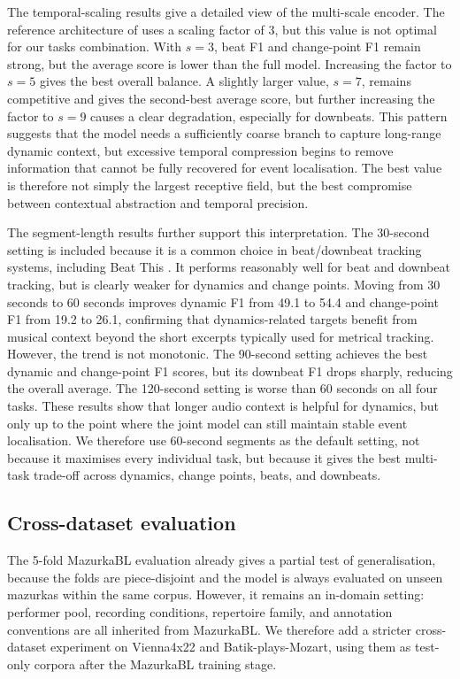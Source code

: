 The temporal-scaling results give a detailed view of the multi-scale encoder. The reference architecture of \cite{li2023frame} uses a scaling factor of 3, but this value is not optimal for our tasks combination. With $s=3$, beat F1 and change-point F1 remain strong, but the average score is lower than the full model. Increasing the factor to $s=5$ gives the best overall balance. A slightly larger value, $s=7$, remains competitive and gives the second-best average score, but further increasing the factor to $s=9$ causes a clear degradation, especially for downbeats. This pattern suggests that the model needs a sufficiently coarse branch to capture long-range dynamic context, but excessive temporal compression begins to remove information that cannot be fully recovered for event localisation. The best value is therefore not simply the largest receptive field, but the best compromise between contextual abstraction and temporal precision.

The segment-length results further support this interpretation. The 30-second setting is included because it is a common choice in beat/downbeat tracking systems, including Beat This \cite{foscarin2024beat}. It performs reasonably well for beat and downbeat tracking, but is clearly weaker for dynamics and change points. Moving from 30 seconds to 60 seconds improves dynamic F1 from 49.1 to 54.4 and change-point F1 from 19.2 to 26.1, confirming that dynamics-related targets benefit from musical context beyond the short excerpts typically used for metrical tracking. However, the trend is not monotonic. The 90-second setting achieves the best dynamic and change-point F1 scores, but its downbeat F1 drops sharply, reducing the overall average. The 120-second setting is worse than 60 seconds on all four tasks. These results show that longer audio context is helpful for dynamics, but only up to the point where the joint model can still maintain stable event localisation. We therefore use 60-second segments as the default setting, not because it maximises every individual task, but because it gives the best multi-task trade-off across dynamics, change points, beats, and downbeats.

\subsection{Cross-dataset evaluation}
\label{ssec:audiodyn_cross_dataset}

The 5-fold MazurkaBL evaluation already gives a partial test of generalisation, because the folds are piece-disjoint and the model is always evaluated on unseen mazurkas within the same corpus. However, it remains an in-domain setting: performer pool, recording conditions, repertoire family, and annotation conventions are all inherited from MazurkaBL. We therefore add a stricter cross-dataset experiment on Vienna4x22 and Batik-plays-Mozart, using them as test-only corpora after the MazurkaBL training stage.

